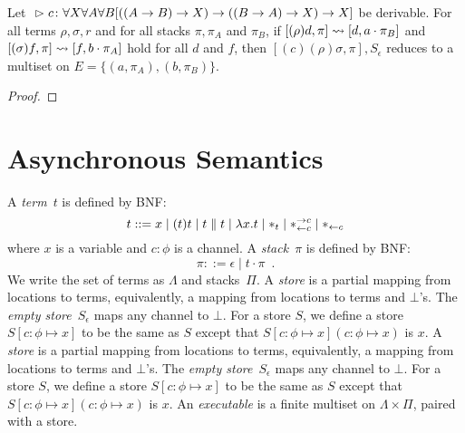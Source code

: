 \begin{proposition}
 Let
 ${}\vartriangleright{}{ {c} \colon{\forall X\forall A\forall B
 [((A\rightarrow B)\rightarrow X)
  \rightarrow((B\rightarrow A)\rightarrow X)
  \rightarrow X]} }$
 be
 derivable.
 For all terms $\rho,\sigma, r$ and for all stacks $\pi, \pi_A$ and
 $\pi_B$,
 if $[(\rho)d  ,\pi]\rightsquigarrow [d,a\cdot \pi_B]$ and
    $[(\sigma)f,\pi]\rightsquigarrow [f,b\cdot \pi_A]$ hold for all $d$ and $f$,
 then
 $[(c)(\rho)\sigma,\pi],S_\epsilon$ reduces to a multiset on
 $E = \{(a,\pi_A),(b,\pi_B)\}$.
\end{proposition}
\begin{proof}
\end{proof}
\section{Asynchronous Semantics}

A \textit{term}~$t$ is defined by BNF:
\[
 t::= x
 \mid (t)t
 \mid t\parallel t
 \mid \lambda x.t
 \mid \ast_t
 \mid \ast^{\rightarrow {c}}_{\leftarrow{c}}
 \mid \ast_{\leftarrow{c}}
\]
where $x$ is a variable and $c\colon\phi$ is a channel.
A \textit{stack}~$\pi$ is defined by BNF:
\[
 \pi ::= \epsilon
 \mid t\cdot \pi
 \enspace.
\]
We write the set of terms as $\Lambda$ and stacks~$\Pi$.
A \textit{store} is a partial mapping from locations to
terms, equivalently, a mapping from locations to terms and $\bot$'s.
The \textit{empty store}~$S_\epsilon$ maps any channel to $\bot$.
For a store $S$, we define a store $S[c\colon\phi\mapsto x]$ to be
the same as $S$ except that $S[c\colon\phi\mapsto x](c\colon\phi\mapsto
x)$ is $x$.
A \textit{store} is a partial mapping from locations to
terms, equivalently, a mapping from locations to terms and $\bot$'s.
The \textit{empty store}~$S_\epsilon$ maps any channel to $\bot$.
For a store $S$, we define a store $S[c\colon\phi\mapsto x]$ to be
the same as $S$ except that $S[c\colon\phi\mapsto x](c\colon\phi\mapsto
x)$ is $x$.
An \textit{executable} is a finite multiset on $\Lambda \times \Pi$,
paired with a store.

